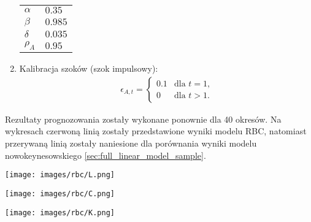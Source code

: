 \begin{enumerate}
\begin{center}
\begin{tabular}{|p{}|p{}|}
                $\alpha$ & $0.35$ \\
                $\beta$ & $0.985$ \\
                $\delta$ & $0.035$ \\
                $\rho_A$ & $0.95$ \\
                \hline 
            \end{tabular} 
         \end{center}
    \item Kalibracja szoków (szok impulsowy):
    \begin{gather}
        \epsilon_{A,t} =
        \begin{cases}
            0.1 & \text{dla $t = 1$,} \\
            0 & \text{dla $t > 1$.}
        \end{cases}
    \end{gather}
\end{enumerate}

Rezultaty prognozowania zostały wykonane ponownie dla 40 okresów. Na wykresach czerwoną linią zostały przedstawione wyniki modelu RBC, natomiast przerywaną linią zostały naniesione dla porównania wyniki modelu nowokeynesowskiego \ref{sec:full_linear_model_sample}. 

\begin{center}
    \begin{minipage}{.3\textwidth}
      \centering
      \captionsetup{type=figure}
      \texttt{[image: images/rbc/L.png]}
      \label{fig:rbc:L}
    \end{minipage}%
    \begin{minipage}{.3\textwidth}
      \centering
      \captionsetup{type=figure}
      \texttt{[image: images/rbc/C.png]}
      \label{fig:rbc:C}
    \end{minipage}
    \begin{minipage}{.3\textwidth}
      \centering
      \captionsetup{type=figure}
      \texttt{[image: images/rbc/K.png]}
      \label{fig:rbc:K}
    \end{minipage}
\end{center}


